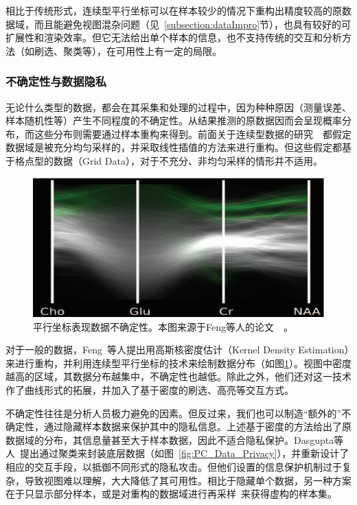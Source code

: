 \documentclass[12pt,twocolumn]{article}
\begin{document}
相比于传统形式，连续型平行坐标可以在样本较少的情况下重构出精度较高的原数据域，而且能避免视图混杂问题（见~\ref{subsection:dataImpro}节），也具有较好的可扩展性和渲染效率。但它无法给出单个样本的信息，也不支持传统的交互和分析方法（如刷选、聚类等），在可用性上有一定的局限。

\subsubsection{不确定性与数据隐私}

无论什么类型的数据，都会在其采集和处理的过程中，因为种种原因（测量误差、样本随机性等）产生不同程度的不确定性。从结果推测的原数据因而会呈现概率分布，而这些分布则需要通过样本重构来得到。前面关于连续型数据的研究~\citep{bachthaler2008continuous}~\citep{heinrich2009continuous}都假定数据域是被充分均匀采样的，并采取线性插值的方法来进行重构。但这些假定都基于格点型的数据（Grid Data），对于不充分、非均匀采样的情形并不适用。

\begin{figure}[!htb]
\centering
\includegraphics[width=1.0\linewidth]{images/PC_Data_Uncertainty.eps}
\caption{\label{fig:PC_Data_Uncertainty}平行坐标表现数据不确定性。本图来源于Feng等人的论文~\citep{feng2010matching}~。
}
\end{figure}

对于一般的数据，Feng~\citep{feng2010matching}等人提出用高斯核密度估计（Kernel Density Estimation）来进行重构，并利用连续型平行坐标的技术来绘制数据分布（如图\ref{fig:PC_Data_Uncertainty}）。视图中密度越高的区域，其数据分布越集中，不确定性也越低。除此之外，他们还对这一技术作了曲线形式的拓展，并加入了基于密度的刷选、高亮等交互方式。

不确定性往往是分析人员极力避免的因素。但反过来，我们也可以制造“额外的”不确定性，通过隐藏样本数据来保护其中的隐私信息。上述基于密度的方法给出了原数据域的分布，其信息量甚至大于样本数据，因此不适合隐私保护。Dasgupta等人~\citep{dasgupta2011adaptive}提出通过聚类来封装底层数据（如图~\ref{fig:PC_Data_Privacy}），并重新设计了相应的交互手段，以抵御不同形式的隐私攻击。但他们设置的信息保护机制过于复杂，导致视图难以理解，大大降低了其可用性。相比于隐藏单个数据，另一种方案在于只显示部分样本，或是对重构的数据域进行再采样~\citep{heinrich2011progressive}来获得虚构的样本集。
\end{document}
